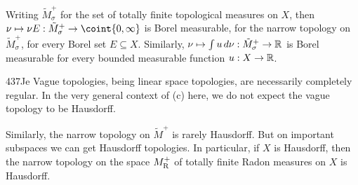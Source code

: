 Writing $\tilde M^+_{\sigma}$ for the set of
totally finite topological measures on $X$, then
$\nu\mapsto\nu E:\tilde M^+_{\sigma}\to\coint{0,\infty}$ is Borel
measurable, for the narrow topology on $\tilde M^+_{\sigma}$, for every
Borel set $E\subseteq X$.   Similarly,
$\nu\mapsto\int u\,d\nu:\tilde M^+_{\sigma}\to\Bbb R$ is Borel measurable for
every bounded measurable function $u:X\to\Bbb R$.

\spheader 437Je Vague topologies, being linear space
topologies, are necessarily completely regular.
In the very general context of (c) here, we do not expect the vague topology to be Hausdorff.

Similarly, the narrow topology on $\tilde M^+$ is rarely Hausdorff.
But on important subspaces we can get Hausdorff topologies.
In particular, if $X$ is Hausdorff, then the
narrow topology on the space $M^+_{\text{R}}$ of totally finite Radon
measures on $X$ is Hausdorff.

